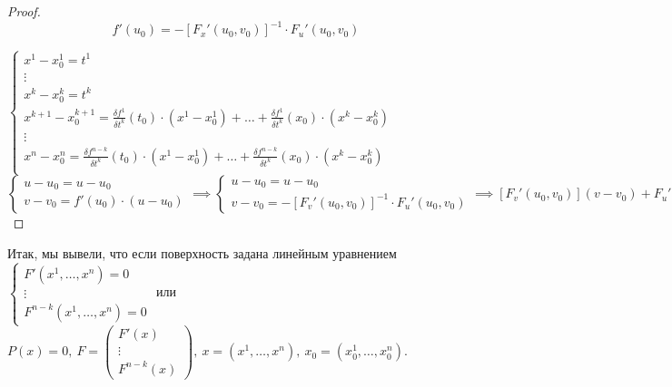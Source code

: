 \documentclass{report}
\theoremstyle{definition}
\begin{document}
\begin{proof}
  \begin{equation*}
    f'(u_0) = -[F_x'(u_0,v_0)]^{-1} \cdot F_u' (u_0,v_0)
  \end{equation*}

  $\left\{\begin{array}{l}
      x^1 - x_0^1 = t^1                                                                                                                                 \\
      \vdots                                                                                                                                            \\
      x^k - x_0^k = t^k                                                                                                                                 \\
      x^{k+1} - x^{k+1}_0 = \frac{\delta f^1}{\delta t^k}(t_0) \cdot (x^1 - x_0^1) + \ldots + \frac{\delta f^1}{\delta t^k}(x_0)\cdot (x^k - x_0^k)     \\
      \vdots                                                                                                                                            \\
      x^{n} - x^{n}_0 = \frac{\delta f^{n-k}}{\delta t^k}(t_0) \cdot (x^1 - x_0^1) + \ldots + \frac{\delta f^{n-k}}{\delta t^k}(x_0)\cdot (x^k - x_0^k) \\
    \end{array}\right.$ \\

  $\left\{\begin{array}{l}
      u - u_0 = u - u_0 \\
      v - v_0 = f'(u_0) \cdot (u - u_0)
    \end{array}\right. \implies \left\{\begin{array}{l}
      u - u_0 = u - u_0 \\
      v - v_0 = -[F_v'(u_0,v_0)]^{-1} \cdot F_u'(u_0,v_0)
    \end{array}\right. \implies [F_v'(u_0,v_0)](v-v_0) + F_u'(u_0,v_0)\cdot (u - u_0) = 0$
\end{proof}

Итак, мы вывели, что если поверхность задана линейным уравнением $\left\{\begin{array}{l}
    F'(x^1,\ldots,x^n) = 0 \\
    \vdots                 \\
    F^{n-k}(x^1,\ldots,x^n) = 0
  \end{array}\right.$ или $P(x) = 0, \ F = \left(\begin{array}{c}
      F'(x)  \\
      \vdots \\
      F^{n-k}(x)
    \end{array}\right), \ x = (x^1,\ldots,x^n), \ x_0 = (x_0^1,\ldots,x_0^n)$.
\end{document}
